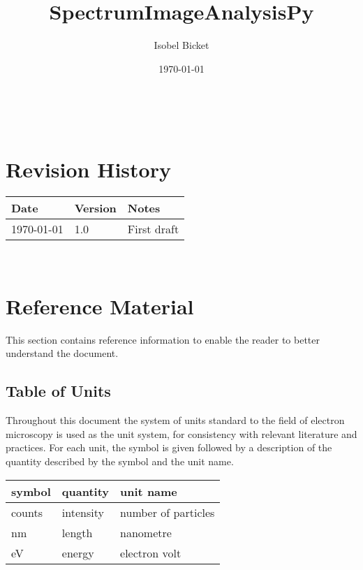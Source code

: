 \documentclass[12pt]{article}
\begin{document}

\title{SpectrumImageAnalysisPy} 
\author{Isobel Bicket}
\date{\today}
	
\maketitle

~\newpage



\section{Revision History}

\begin{tabularx}{\textwidth}{p{4cm}p{2cm}X}
	\toprule {\bf Date} & {\bf Version} & {\bf Notes}\\
	\midrule
	\today & 1.0 & First draft\\
	\bottomrule
\end{tabularx}

~\newpage

\tableofcontents

\section{Reference Material}

This section contains reference information to enable the reader to better understand the document.

\subsection{Table of Units}

Throughout this document the system of units standard to the field of electron microscopy is used
as the unit system, for consistency with relevant literature and practices. For each unit, the symbol is given followed by a
description of the quantity described by the symbol and the unit name.
~\newline

\renewcommand{\arraystretch}{1.2}
  \noindent \begin{tabular}{l l l} 
    \toprule		
    \textbf{symbol} & \textbf{quantity} & \textbf{unit name}\\
    \midrule 
    counts & intensity & number of particles\\
    \si{\nano\metre} & length & nanometre\\
    \si{\electronvolt} & energy	& electron volt\\
    \bottomrule
  \end{tabular}
\end{document}
